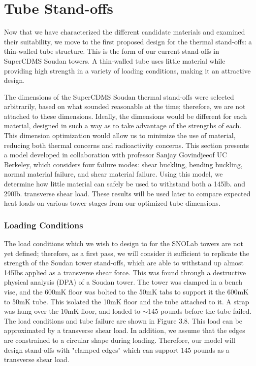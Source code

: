 \documentclass{report}
\begin{document}
\section{Tube Stand-offs}

Now that we have characterized the different candidate materials and examined their suitability, we move to the first proposed design for the thermal stand-offs: a thin-walled tube structure. This is the form of our current stand-offs in SuperCDMS Soudan towers. A thin-walled tube uses little material while providing high strength in a variety of loading conditions, making it an attractive design. 

The dimensions of the SuperCDMS Soudan thermal stand-offs were selected arbitrarily, based on what sounded reasonable at the time; therefore, we are not attached to these dimensions. Ideally, the dimensions would be different for each material, designed in such a way as to take advantage of the strengths of each. This dimension optimization would allow us to minimize the use of material, reducing both thermal concerns and radioactivity concerns. This section presents a model developed in collaboration with professor Sanjay Govindjee\footnotemark  of UC Berkeley, which considers four failure modes: shear buckling, bending buckling, normal material failure, and shear material failure. Using this model, we determine how little material can safely be used to withstand both a 145lb. and 290lb. transverse shear load. These results will be used later to compare expected heat loads on various tower stages from our optimized tube dimensions.


\subsubsection{Loading Conditions}

The load conditions which we wish to design to for the SNOLab towers are not yet defined; therefore, as a first pass, we will consider it sufficient to replicate the strength of the Soudan tower stand-offs, which are able to withstand up almost 145lbs applied as a transverse shear force. This was found through a destructive physical analysis (DPA) of a Soudan tower. The tower was clamped in a bench vise, and the 600mK floor was bolted to the 50mK tabs to support it the 600mK to 50mK tube. This isolated the 10mK floor and the tube attached to it. A strap was hung over the 10mK floor, and loaded to $\sim$145 pounds before the tube failed. The load conditions and tube failure are shown in Figure 3.8. This load can be approximated by a transverse shear load. In addition, we assume that the edges are constrained to a circular shape during loading. Therefore, our model will design stand-offs with "clamped edges" which can support 145 pounds as a transverse shear load.
\end{document}
